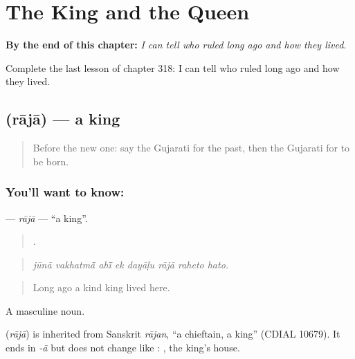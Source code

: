 
\chapter{The King and the Queen}
\label{ch:gu-the-king-and-the-queen}

\begin{chapteropening}
\textbf{By the end of this chapter:} \emph{I can tell who ruled long ago and how they lived.}

Complete the last lesson of chapter 318: I can tell who ruled long ago and how they lived.
\end{chapteropening}

\section[\texorpdfstring{\gu{રાજા} (rājā)}{રાજા (rājā)}]{ (rājā) — a king}

\label{lesson:GU-C318-raja}



\begin{quote}
Before the new one: say the Gujarati for the past, then the Gujarati for to be born.
\end{quote}

\subsection*{You'll want to know: }
\textbf{} — \emph{rājā} — \textquotedblleft{}a king\textquotedblright{}.

\begin{quote}
       .
\end{quote}

\begin{quote}
\emph{jūnā vakhatmā̃ ahī̃ ek dayāḷu rājā raheto hato.}
\end{quote}

\begin{quote}
Long ago a kind king lived here.
\end{quote}

A masculine noun.

\begin{cousinweb}
\textbf{} (\emph{rājā}) is inherited from Sanskrit \emph{rājan}, \textquotedblleft{}a chieftain, a king\textquotedblright{} (CDIAL 10679). It ends in \emph{-ā} but does not change like \textbf{}: \textbf{ }, the king's house.
\end{cousinweb}

